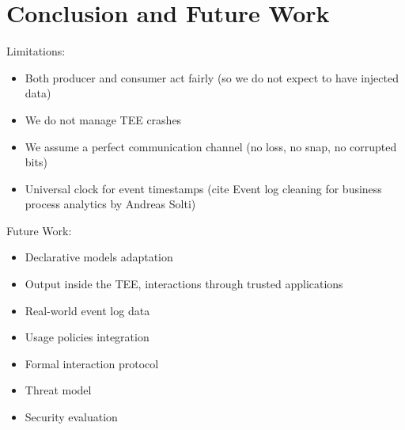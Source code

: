 \section{Conclusion and Future Work}
\label{sec:conclusion}
Limitations:
\begin{itemize}
    \item Both producer and consumer act fairly (so we do not expect to have injected data)
    \item We do not manage TEE crashes
    \item We assume a perfect communication channel (no loss, no snap, no corrupted bits)
    \item Universal clock for event timestamps (cite Event log cleaning for business process analytics by Andreas Solti)
\end{itemize} 
Future Work:
\begin{itemize}
    \item Declarative models adaptation
    \item Output inside the TEE, interactions through trusted applications
    \item Real-world event log data
    \item Usage policies integration
    \item Formal interaction protocol
    \item Threat model
    \item Security evaluation
\end{itemize}


